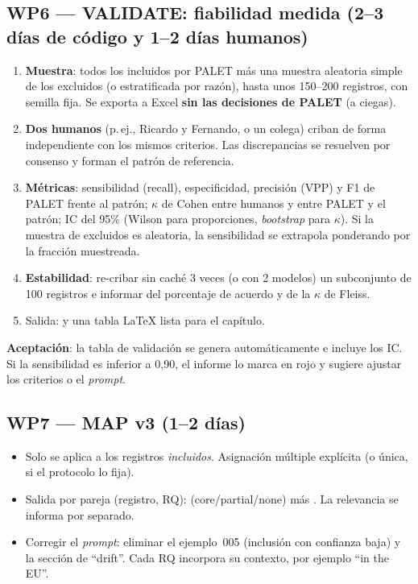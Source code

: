 \documentclass[11pt,a4paper]{article}
\newcommand{\WP}[1]{\textbf{\textcolor{palet}{WP#1}}}
\begin{document}
\subsection*{\WP{6} — VALIDATE: fiabilidad medida (2--3 días de código y 1--2 días humanos)}
\begin{enumerate}
  \item \textbf{Muestra}: todos los incluidos por PALET más una muestra aleatoria simple de los excluidos (o estratificada por razón), hasta unos 150--200 registros, con semilla fija. Se exporta a Excel \textbf{sin las decisiones de PALET} (a ciegas).
  \item \textbf{Dos humanos} (p.\,ej., Ricardo y Fernando, o un colega) criban de forma independiente con los mismos criterios. Las discrepancias se resuelven por consenso y forman el patrón de referencia.
  \item \textbf{Métricas}: sensibilidad (recall), especificidad, precisión (VPP) y F1 de PALET frente al patrón; $\kappa$ de Cohen entre humanos y entre PALET y el patrón; IC del 95\% (Wilson para proporciones, \emph{bootstrap} para $\kappa$). Si la muestra de excluidos es aleatoria, la sensibilidad se extrapola ponderando por la fracción muestreada.
  \item \textbf{Estabilidad}: re-cribar sin caché 3 veces (o con 2 modelos) un subconjunto de 100 registros e informar del porcentaje de acuerdo y de la $\kappa$ de Fleiss.
  \item Salida:  y una tabla LaTeX lista para el capítulo.
\end{enumerate}
\textbf{Aceptación}: la tabla de validación se genera automáticamente e incluye los IC. Si la sensibilidad es inferior a 0{,}90, el informe lo marca en rojo y sugiere ajustar los criterios o el \emph{prompt}.

\subsection*{\WP{7} — MAP v3 (1--2 días)}
\begin{itemize}
  \item Solo se aplica a los registros \emph{incluidos}. Asignación múltiple explícita (o única, si el protocolo lo fija).
  \item Salida por pareja (registro, RQ):  (core/partial/none) más . La relevancia  se informa por separado.
  \item Corregir el \emph{prompt}: eliminar el ejemplo~005 (inclusión con confianza baja) y la sección de ``drift''. Cada RQ incorpora su contexto, por ejemplo ``in the EU''.
\end{itemize}
\end{document}
